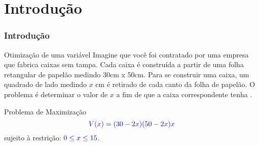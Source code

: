 \section{Introdução}


\begin{frame}[label=introducao]
\frametitle{Introdução}

\begin{block}{Otimização de uma variável}
Imagine que você foi contratado por uma empresa que fabrica caixas sem tampa. Cada caixa é construída a partir de uma folha retangular de papelão medindo 30cm x 50cm. Para se construir uma caixa, um quadrado de lado medindo $x$ cm é retirado de cada canto da folha de papelão. O problema é determinar o valor de $x$ a fim de que a caixa correspondente tenha . 
\end{block}



\begin{alertblock}{Problema de Maximização}
\[\textcolor{blue}{V(x)=(30-2x)(50-2x)x}\] 
sujeito à restrição: $\textcolor{blue}{0\leq x\leq 15}$.
\end{alertblock}

\end{frame}



